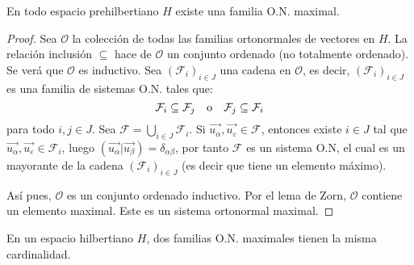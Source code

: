 \documentclass[12pt]{report}
\theoremstyle{largebreak}
\newcommand\pint[2]{\ensuremath{\left(#1\big| #2\right)}}
\begin{document}
    \begin{theor}
        En todo espacio prehilbertiano $H$ existe una familia O.N. maximal.
    \end{theor}

    \begin{proof}
        Sea $\mathcal{O}$ la colección de todas las familias ortonormales de vectores en $H$. La relación inclusión $\subseteq$ hace de $\mathcal{O}$ un conjunto ordenado (no totalmente ordenado). Se verá que $\mathcal{O}$ es inductivo. Sea $\left(\mathcal{F}_i \right)_{i\in J}$ una cadena en $\mathcal{O}$, es decir, $\left(\mathcal{F}_i \right)_{i\in J}$ es una familia de sistemas O.N. tales que:
        \begin{equation*}
            \mathcal{F}_i\subseteq\mathcal{F}_j\quad\textup{o}\quad\mathcal{F}_j\subseteq\mathcal{F}_i
        \end{equation*}
        para todo $i,j\in J$. Sea $\mathcal{F}=\bigcup_{ i\in J}\mathcal{F}_i$. Si $\vec{u_\alpha},\vec{u_\varepsilon}\in\mathcal{F}$, entonces existe $i\in J$ tal que $\vec{u_\alpha},\vec{u_\varepsilon}\in\mathcal{F}_i$, luego $\pint{\vec{u_\alpha}}{\vec{u_\beta}}=\delta_{\alpha\beta}$, por tanto $\mathcal{F}$ es un sistema O.N, el cual es un mayorante de la cadena $\left(\mathcal{F}_i \right)_{i\in J}$ (es decir que tiene un elemento máximo).
        
        Así pues, $\mathcal{O}$ es un conjunto ordenado inductivo. Por el lema de Zorn, $\mathcal{O}$ contiene un elemento maximal. Este es un sistema ortonormal maximal.
    \end{proof}

    \begin{theor}
        En un espacio hilbertiano $H$, dos familias O.N. maximales tienen la misma cardinalidad.
    \end{theor}
\end{document}
